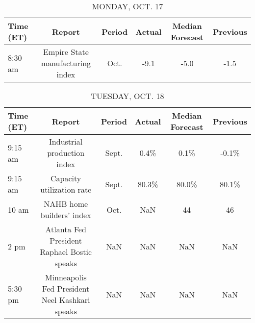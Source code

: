 \documentclass{article}%
\begin{document}
%
\normalsize%


\begin{table}[htbp]%
\caption{MONDAY, OCT. 17}%
\centering%
\begin{adjustbox}{width=1\textwidth}%
\begin{tabular}{lccccc}
\toprule
Time (ET) &                           Report & Period & Actual & Median Forecast & Previous \\
\midrule
  8:30 am & Empire State manufacturing index &   Oct. &   -9.1 &            -5.0 &     -1.5 \\
\bottomrule
\end{tabular}
%
\end{adjustbox}%
\end{table}

%


\begin{table}[htbp]%
\caption{TUESDAY, OCT. 18}%
\centering%
\begin{adjustbox}{width=1\textwidth}%
\begin{tabular}{lccccc}
\toprule
Time (ET) &                                         Report & Period & Actual & Median Forecast & Previous \\
\midrule
  9:15 am &                    Industrial production index &  Sept. &   0.4\% &            0.1\% &    -0.1\% \\
  9:15 am &                      Capacity utilization rate &  Sept. &  80.3\% &           80.0\% &    80.1\% \\
    10 am &                      NAHB home builders' index &   Oct. &    NaN &              44 &       46 \\
     2 pm &    Atlanta Fed President Raphael Bostic speaks &    NaN &    NaN &             NaN &      NaN \\
  5:30 pm & Minneapolis Fed President Neel Kashkari speaks &    NaN &    NaN &             NaN &      NaN \\
\bottomrule
\end{tabular}
%
\end{adjustbox}%
\end{table}

%
\end{document}
